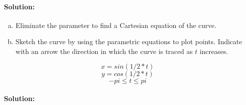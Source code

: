 \documentclass[12pt]{article}
\newenvironment{problem}[2][Problem]{\begin{trivlist}
\item[\hskip \labelsep {\bfseries #1}\hskip \labelsep {\bfseries #2.}]}{\end{trivlist}}
\newenvironment{solution}{\paragraph{Solution:}}{\hfill}
\newcommand{\pgraph}[4]{
    \begin{center}
    	
    \begin{tikzpicture}
    \begin{axis}[
        trig format plots=rad,
        axis equal,
        grid=both
    ]
    \addplot [domain=#3:#4, variable=\t, samples=50, black, decoration={
        markings,
        mark=between positions 0.2 and 1 step 4em with {\arrow [scale=1.5]{stealth}}
        }, postaction=decorate] 
    ({#1}, {#2});
    
    \end{axis}
    \end{tikzpicture}
    
    \end{center}
}
\begin{document}
\begin{solution}


\end{solution}




\newpage
\def \xt {sin(1/2*t)}
\def \yt {cos(1/2*t)}
\def \dl {-pi}
\def \dr {pi}

\begin{problem}{10.1.11}

\begin{enumerate}[(a)]
\item Eliminate the parameter to find a Cartesian equation of the curve.
\item Sketch the curve by using the parametric equations to plot points. Indicate with an arrow the direction in which the curve is traced as $t$ increases.
\end{enumerate}

\[ 	x = \xt \]
\[	y = \yt \]
\[	\dl \leqslant t \leqslant \dr \]
\end{problem}

\begin{solution}


\end{solution}
\end{document}
